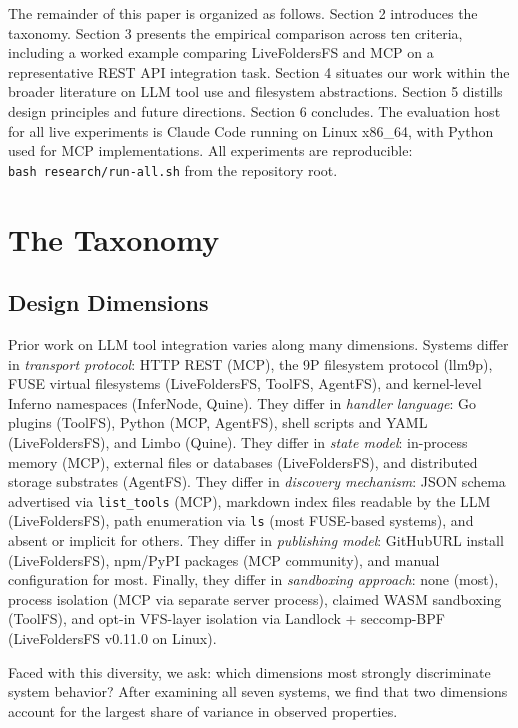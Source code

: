 \documentclass[
  11pt,
]{article}
\begin{document}
The remainder of this paper is organized as follows. Section 2
introduces the taxonomy. Section 3 presents the empirical comparison
across ten criteria, including a worked example comparing LiveFoldersFS
and MCP on a representative REST API integration task. Section 4
situates our work within the broader literature on LLM tool use and
filesystem abstractions. Section 5 distills design principles and future
directions. Section 6 concludes. The evaluation host for all live
experiments is Claude Code running on Linux x86\_64, with Python used
for MCP implementations. All experiments are reproducible:
\texttt{bash\ research/run-all.sh} from the repository root.

\hypertarget{the-taxonomy}{%
\section{The Taxonomy}\label{the-taxonomy}}

\hypertarget{design-dimensions}{%
\subsection{Design Dimensions}\label{design-dimensions}}

Prior work on LLM tool integration varies along many dimensions. Systems
differ in \emph{transport protocol}: HTTP REST (MCP), the 9P filesystem
protocol (llm9p), FUSE virtual filesystems (LiveFoldersFS, ToolFS,
AgentFS), and kernel-level Inferno namespaces (InferNode, Quine). They
differ in \emph{handler language}: Go plugins (ToolFS), Python (MCP,
AgentFS), shell scripts and YAML (LiveFoldersFS), and Limbo (Quine).
They differ in \emph{state model}: in-process memory (MCP), external
files or databases (LiveFoldersFS), and distributed storage substrates
(AgentFS). They differ in \emph{discovery mechanism}: JSON schema
advertised via \texttt{list\_tools} (MCP), markdown index files readable
by the LLM (LiveFoldersFS), path enumeration via \texttt{ls} (most
FUSE-based systems), and absent or implicit for others. They differ in
\emph{publishing model}: GitHubURL install (LiveFoldersFS), npm/PyPI
packages (MCP community), and manual configuration for most. Finally,
they differ in \emph{sandboxing approach}: none (most), process
isolation (MCP via separate server process), claimed WASM sandboxing
(ToolFS), and opt-in VFS-layer isolation via Landlock + seccomp-BPF
(LiveFoldersFS v0.11.0 on Linux).

Faced with this diversity, we ask: which dimensions most strongly
discriminate system behavior? After examining all seven systems, we find
that two dimensions account for the largest share of variance in
observed properties.
\end{document}

